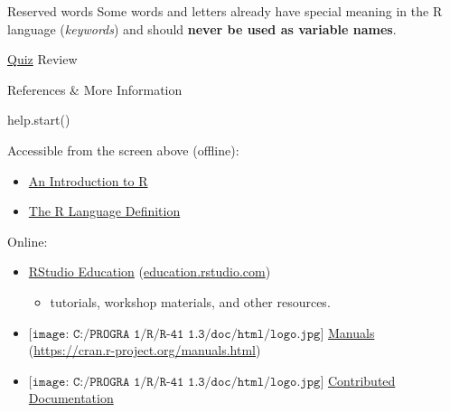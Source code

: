 \documentclass[
  ignorenonframetext,
]{beamer}
\newenvironment{Shaded}{\begin{snugshade}}{\end{snugshade}}
\newcommand{\FunctionTok}[1]{\textcolor[rgb]{0.00,0.00,0.00}{#1}}
\newcommand{\NormalTok}[1]{#1}
\providecommand{\tightlist}{%
  \setlength{\itemsep}{0pt}\setlength{\parskip}{0pt}}
\begin{document}
\begin{frame}{Reserved words}
\protect\hypertarget{reserved-words}{}
Some words and letters already have special meaning in the R language
(\emph{keywords}) and should \textbf{never be used as variable names}.
\end{frame}

\begin{frame}[fragile]{\protect\hyperlink{pop-quiz}{Quiz} Review}
\protect\hypertarget{quiz-review}{}
\end{frame}

\begin{frame}[fragile]{References \& More Information}
\protect\hypertarget{references-more-information}{}
\begin{Shaded}
\begin{Highlighting}[]
\FunctionTok{help.start}\NormalTok{()}
\end{Highlighting}
\end{Shaded}

Accessible from the screen above (offline):

\begin{itemize}
\tightlist
\item
  \href{https://cran.r-project.org/doc/manuals/r-release/R-intro.html}{An
  Introduction to R}
\item
  \href{https://cran.r-project.org/doc/manuals/r-release/R-lang.html}{The
  R Language Definition}
\end{itemize}

Online:

\begin{itemize}
\tightlist
\item
  \href{https://education.rstudio.com/}{RStudio Education}
  (\href{https://education.rstudio.com/}{education.rstudio.com})

  \begin{itemize}
  \tightlist
  \item
    tutorials, workshop materials, and other resources.
  \end{itemize}
\item
  \(\texttt{[image: C:/PROGRA~1/R/R-41~1.3/doc/html/logo.jpg]}\)
  \href{https://cran.r-project.org/manuals.html}{Manuals}
  (\url{https://cran.r-project.org/manuals.html})
\item
  \(\texttt{[image: C:/PROGRA~1/R/R-41~1.3/doc/html/logo.jpg]}\)
  \href{https://cran.r-project.org/other-docs.html}{Contributed
  Documentation}


\end{itemize}
\end{frame}
\end{document}
